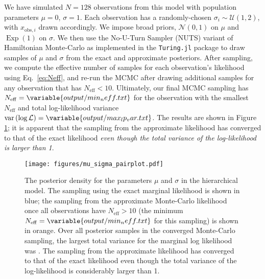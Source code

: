 \documentclass[modern]{aastex631}
\newcommand{\Neff}{N_{\mathrm{eff}}}
\DeclareMathOperator{\Exp}{Exp}
\DeclareMathOperator{\var}{var}
\begin{document}
We have simulated $N = 128$ observations from this model with population
parameters $\mu = 0$, $\sigma = 1$.  Each observation has a randomly-chosen
$\sigma_i \sim \mathcal{U}(1, 2)$, with $x_{\mathrm{obs},i}$ drawn accordingly.
We impose broad priors, $\mathcal{N}(0,1)$ on $\mu$ and $\Exp(1)$ on $\sigma$.
We then use the No-U-Turn Sampler (NUTS) \citep{Hoffman2011} variant of
Hamiltonian Monte-Carlo \citep{Neal2011} as implemented in the
\texttt{Turing.jl} package \citep{Ge2018} to draw samples of $\mu$ and $\sigma$
from the exact and approximate posteriors.  After sampling, we compute the
effective number of samples for each observation's likelihood using Eq.\
\eqref{eq:Neff}, and re-run the MCMC after drawing additional samples for any
observation that has $\Neff < 10$.  Ultimately, our final MCMC sampling has
$\Neff = \variable{output/min_neff.txt}$ for the observation with the smallest
$\Neff$ and total log-likelihood variance $\var\left( \log \mathcal{L} \right) =
\variable{output/max_lp_var.txt}$. The results are shown in Figure
\ref{fig:mu-sigma}; it is apparent that the sampling from the approximate
likelihood has converged to that of the exact likelihood \emph{even though the
total variance of the log-likelihood is larger than 1}.  

\begin{figure}
    \texttt{[image: figures/mu\_sigma\_pairplot.pdf]}
    \caption{\label{fig:mu-sigma} The posterior density for the parameters $\mu$
    and $\sigma$ in the hierarchical model.  The sampling using the exact
    marginal likelihood is shown in blue; the sampling from the approximate
    Monte-Carlo likelihood once all observations have $\Neff > 10$ (the minimum
    $\Neff = \variable{output/min_neff.txt}$ for this sampling) is shown in
    orange. Over all posterior samples in the converged Monte-Carlo sampling,
    the largest total variance for the marginal log likelihood was
    \variable{output/max_lp_var.txt}.  The sampling from the approximate
    likelihood has converged to that of the exact likelihood even though the
    total variance of the log-likelihood is considerably larger than 1.}
\end{figure}


\end{document}
